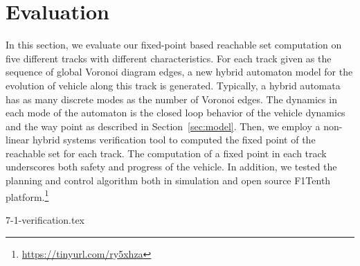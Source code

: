 \section{Evaluation}
In this section, we evaluate our fixed-point based reachable set computation on five different tracks with different characteristics. 
%
For each track given as the sequence of global Voronoi diagram edges, a new hybrid automaton model for the evolution of vehicle along this track is generated. Typically, a hybrid automata has as many discrete modes as the number of Voronoi edges. 
%
The dynamics in each mode of the  automaton is the closed loop behavior of the vehicle dynamics and the way point as described in Section~\ref{sec:model}.
%
Then, we employ a non-linear hybrid systems verification tool to computed the fixed point of the reachable set for each track.
%
The computation of a fixed point in each track underscores both safety and progress of the vehicle.
%
In addition, we tested the planning and control algorithm both in simulation and open source F1Tenth platform.\footnote{\url{https://tinyurl.com/ry5xhza}}

{7-1-verification.tex}
